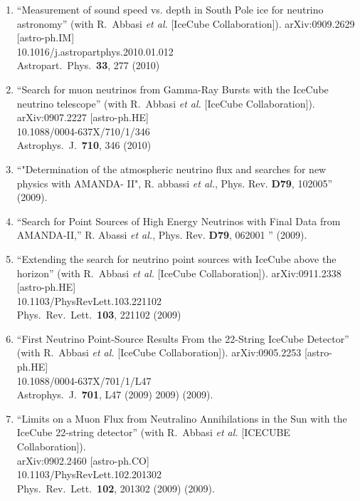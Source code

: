 \begin{enumerate}
\item ``Measurement of sound speed vs. depth in South Pole
        ice for neutrino   astronomy'' (with R.~Abbasi {\it
        et al.}  [IceCube Collaboration]). arXiv:0909.2629
        [astro-ph.IM]
        \\{}10.1016/j.astropartphys.2010.01.012
        \\{}Astropart.\ Phys.\ {\bf     33}, 277 (2010)

\item ``Search for muon neutrinos from Gamma-Ray Bursts with
        the IceCube   neutrino telescope'' (with R.~Abbasi
        {\it et al.}  [IceCube     Collaboration]).
        \\{}arXiv:0907.2227 [astro-ph.HE]
        \\{}10.1088/0004-637X/710/1/346 \\{}Astrophys.\ J.\
        {\bf 710}, 346   (2010) %

\item ``"Determination of the atmospheric neutrino flux and
        searches for   new physics with AMANDA- II", R.
        abbassi {\it et al.}, Phys. Rev. {\bf     D79},
        102005'' (2009).

\item ``Search for Point Sources of High Energy Neutrinos
        with Final   Data from AMANDA-II,” R. Abassi {\it
        et al.}, Phys. Rev. {\bf D79}, 062001  '' (2009).

\item ``Extending the search for neutrino point sources with
        IceCube above   the horizon'' (with R.~Abbasi {\it
        et al.}  [IceCube Collaboration]). arXiv:0911.2338
        [astro-ph.HE] \\{}10.1103/PhysRevLett.103.221102
        \\{}Phys.\ Rev.\ Lett.\ {\bf 103}, 221102 (2009)

\item ``First Neutrino Point-Source Results From the
        22-String IceCube   Detector'' (with R.~Abbasi {\it
        et al.}  [IceCube Collaboration]). arXiv:0905.2253
        [astro-ph.HE] \\{}10.1088/0004-637X/701/1/L47
        \\{}Astrophys.\ J.\ {\bf 701}, L47 (2009) %
        2009)  (2009).

\item ``Limits on a Muon Flux from Neutralino Annihilations
        in the Sun with   the IceCube 22-string detector''
        (with R.~Abbasi {\it et al.}   [ICECUBE
        Collaboration]).  \\{}arXiv:0902.2460 [astro-ph.CO]
        \\{}10.1103/PhysRevLett.102.201302 \\{}Phys.\ Rev.\
        Lett.\ {\bf     102}, 201302 (2009) %
        (2009).


\end{enumerate}

